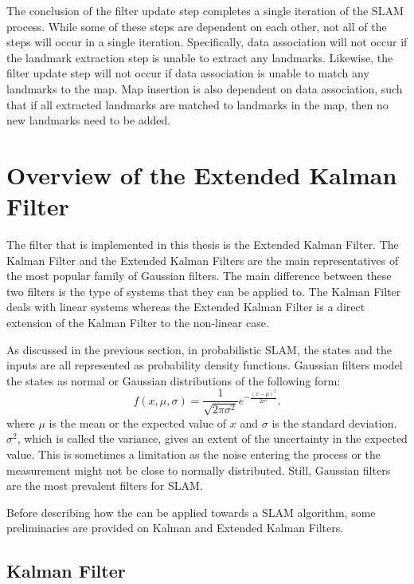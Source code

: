 The conclusion of the filter update step completes a single iteration of the SLAM process. While some of these steps are dependent on each other, not all of the steps will occur in a single iteration. Specifically, data association will not occur if the landmark extraction step is unable to extract any landmarks. Likewise, the filter update step will not occur if data association is unable to match any landmarks to the map. Map insertion is also dependent on data association, such that if all extracted landmarks are matched to landmarks in the map, then no new landmarks need to be added. 

\section{Overview of the Extended Kalman Filter}

The filter that is implemented in this thesis is the Extended Kalman Filter. The Kalman Filter and  the  Extended Kalman Filters are  the  main representatives  of  the most popular family of Gaussian filters. The main difference between these two filters is  the type of systems that they can be applied to.  The  Kalman Filter deals with linear systems whereas the Extended Kalman Filter is a direct extension of the Kalman Filter to the non-linear case.

As discussed in the previous section, in probabilistic SLAM, the states and the inputs are all represented as probability density functions. Gaussian filters model the states as normal or Gaussian distributions of the following form:
\begin{equation}
f(x, \mu, \sigma) = \frac{1}{\sqrt{2\pi\sigma^2} } e^{ -\frac{(x-\mu)^2}{2\sigma^2} }.
\label{eq:normalDistribution}
\end{equation}
where $ \mu $ is the mean or the expected value of $ x $ and $ \sigma $ is the standard deviation. $ \sigma^2 $, which is called the variance, gives an extent of the uncertainty in the expected value. This is sometimes a limitation as the noise entering the process or the measurement might not be close to normally distributed. Still, Gaussian filters are the most prevalent filters for SLAM. 


Before describing how the \ekf can be applied towards a SLAM  algorithm,  some preliminaries are provided on Kalman and Extended Kalman Filters.

\subsection{Kalman Filter}
\label{sec:KalmanFilter}

